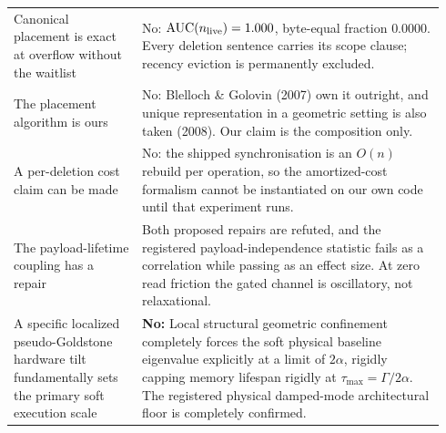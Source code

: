 \documentclass{article}
\begin{document}
\begin{center}
\begin{tabular}{p{0.28\linewidth}p{0.66\linewidth}}
Canonical placement is exact at overflow without the waitlist & No: $\mathrm{AUC}(n_{\rm live})=1.000$, byte-equal fraction $0.0000$. Every deletion sentence carries its scope clause; recency eviction is permanently excluded.\\
The placement algorithm is ours & No: Blelloch \& Golovin (2007) own it outright, and unique representation in a geometric setting is also taken (2008). Our claim is the composition only.\\
A per-deletion cost claim can be made & No: the shipped synchronisation is an $O(n)$ rebuild per operation, so the amortized-cost formalism cannot be instantiated on our own code until that experiment runs.\\
The payload-lifetime coupling has a repair & Both proposed repairs are refuted, and the registered payload-independence statistic fails as a correlation while passing as an effect size. At zero read friction the gated channel is oscillatory, not relaxational.\\
A specific localized pseudo-Goldstone hardware tilt fundamentally sets the primary soft execution scale & \textbf{No:} Local structural geometric confinement completely forces the soft physical baseline eigenvalue explicitly at a limit of $2\alpha$, rigidly capping memory lifespan rigidly at $\tau_{\max}=\Gamma/2\alpha$. The registered physical damped-mode architectural floor is completely confirmed.\\
\bottomrule
\end{tabular}
\end{center}
\end{document}
